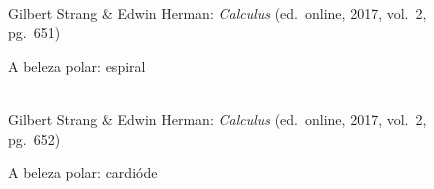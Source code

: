 \begin{figure}[H]
  \begin{center}
    \caption{A beleza polar: espiral}
    \label{fig:belo1}
    \\
    \footnotesize{Gilbert Strang \& Edwin Herman: \emph{Calculus}
      (ed.\ online, 2017, vol.\ 2, pg.\ 651)}
  \end{center}
\end{figure}

\begin{figure}[H]
  \begin{center}
    \caption{A beleza polar: cardióde}
    \label{fig:belo2}
    \\
    \footnotesize{Gilbert Strang \& Edwin Herman: \emph{Calculus}
        (ed.\ online, 2017, vol.\ 2, pg.\ 652)}
  \end{center}
\end{figure}

